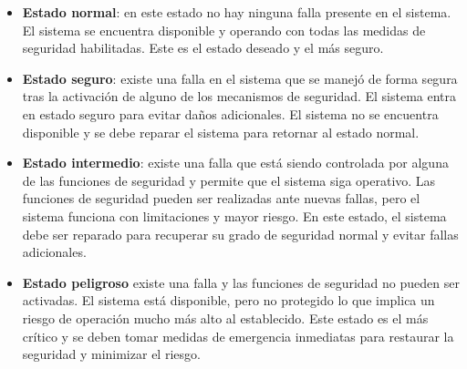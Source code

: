 \begin{itemize}
    \item \textbf{Estado normal}: en este estado no hay ninguna falla presente en el sistema. El sistema se encuentra disponible y operando con todas las medidas de seguridad habilitadas. Este es el estado deseado y el más seguro. 
    \item \textbf{Estado seguro}: existe una falla en el sistema que se manejó de forma segura tras la activación de alguno de los mecanismos de seguridad. El sistema entra en estado seguro para evitar daños adicionales. El sistema no se encuentra disponible y se debe reparar el sistema para retornar al estado normal. 
    \item \textbf{Estado intermedio}: existe una falla que está siendo controlada por alguna de las funciones de seguridad y permite que el sistema siga operativo. Las funciones de seguridad pueden ser realizadas ante nuevas fallas, pero el sistema funciona con limitaciones y mayor riesgo. En este estado, el sistema debe ser reparado para recuperar su grado de seguridad normal y evitar fallas adicionales. 
    \item \textbf{Estado peligroso} existe una falla y las funciones de seguridad no pueden ser activadas. El sistema está disponible, pero no protegido lo que implica un riesgo de operación mucho más alto al establecido. Este estado es el más crítico y se deben tomar medidas de emergencia inmediatas para restaurar la seguridad y minimizar el riesgo. \\ 
    
\end{itemize}




